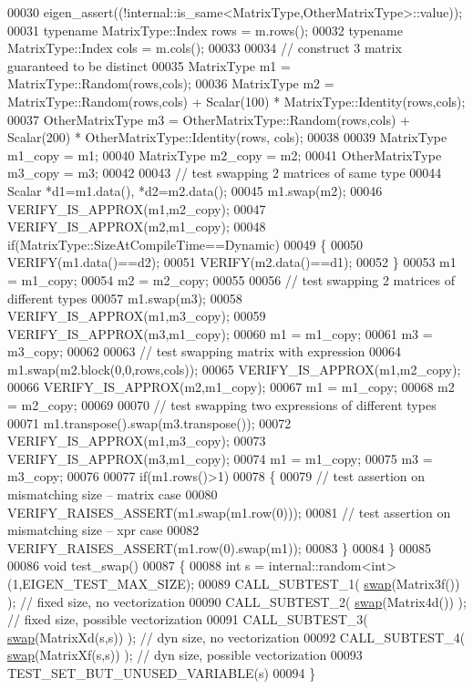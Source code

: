 \begin{DoxyCode}
00030   eigen\_assert((!internal::is\_same<MatrixType,OtherMatrixType>::value));
00031   \textcolor{keyword}{typename} MatrixType::Index rows = m.rows();
00032   \textcolor{keyword}{typename} MatrixType::Index cols = m.cols();
00033   
00034   \textcolor{comment}{// construct 3 matrix guaranteed to be distinct}
00035   MatrixType m1 = MatrixType::Random(rows,cols);
00036   MatrixType m2 = MatrixType::Random(rows,cols) + Scalar(100) * MatrixType::Identity(rows,cols);
00037   OtherMatrixType m3 = OtherMatrixType::Random(rows,cols) + Scalar(200) * OtherMatrixType::Identity(rows,
      cols);
00038   
00039   MatrixType m1\_copy = m1;
00040   MatrixType m2\_copy = m2;
00041   OtherMatrixType m3\_copy = m3;
00042   
00043   \textcolor{comment}{// test swapping 2 matrices of same type}
00044   Scalar *d1=m1.data(), *d2=m2.data();
00045   m1.swap(m2);
00046   VERIFY\_IS\_APPROX(m1,m2\_copy);
00047   VERIFY\_IS\_APPROX(m2,m1\_copy);
00048   \textcolor{keywordflow}{if}(MatrixType::SizeAtCompileTime==Dynamic)
00049   \{
00050     VERIFY(m1.data()==d2);
00051     VERIFY(m2.data()==d1);
00052   \}
00053   m1 = m1\_copy;
00054   m2 = m2\_copy;
00055   
00056   \textcolor{comment}{// test swapping 2 matrices of different types}
00057   m1.swap(m3);
00058   VERIFY\_IS\_APPROX(m1,m3\_copy);
00059   VERIFY\_IS\_APPROX(m3,m1\_copy);
00060   m1 = m1\_copy;
00061   m3 = m3\_copy;
00062   
00063   \textcolor{comment}{// test swapping matrix with expression}
00064   m1.swap(m2.block(0,0,rows,cols));
00065   VERIFY\_IS\_APPROX(m1,m2\_copy);
00066   VERIFY\_IS\_APPROX(m2,m1\_copy);
00067   m1 = m1\_copy;
00068   m2 = m2\_copy;
00069 
00070   \textcolor{comment}{// test swapping two expressions of different types}
00071   m1.transpose().swap(m3.transpose());
00072   VERIFY\_IS\_APPROX(m1,m3\_copy);
00073   VERIFY\_IS\_APPROX(m3,m1\_copy);
00074   m1 = m1\_copy;
00075   m3 = m3\_copy;
00076   
00077   \textcolor{keywordflow}{if}(m1.rows()>1)
00078   \{
00079     \textcolor{comment}{// test assertion on mismatching size -- matrix case}
00080     VERIFY\_RAISES\_ASSERT(m1.swap(m1.row(0)));
00081     \textcolor{comment}{// test assertion on mismatching size -- xpr case}
00082     VERIFY\_RAISES\_ASSERT(m1.row(0).swap(m1));
00083   \}
00084 \}
00085 
00086 \textcolor{keywordtype}{void} test\_swap()
00087 \{
00088   \textcolor{keywordtype}{int} s = internal::random<int>(1,EIGEN\_TEST\_MAX\_SIZE);
00089   CALL\_SUBTEST\_1( \hyperlink{endian_8c_a3ca5ecd34b04d6a243c054ac3a57f68d}{swap}(Matrix3f()) ); \textcolor{comment}{// fixed size, no vectorization }
00090   CALL\_SUBTEST\_2( \hyperlink{endian_8c_a3ca5ecd34b04d6a243c054ac3a57f68d}{swap}(Matrix4d()) ); \textcolor{comment}{// fixed size, possible vectorization }
00091   CALL\_SUBTEST\_3( \hyperlink{endian_8c_a3ca5ecd34b04d6a243c054ac3a57f68d}{swap}(MatrixXd(s,s)) ); \textcolor{comment}{// dyn size, no vectorization }
00092   CALL\_SUBTEST\_4( \hyperlink{endian_8c_a3ca5ecd34b04d6a243c054ac3a57f68d}{swap}(MatrixXf(s,s)) ); \textcolor{comment}{// dyn size, possible vectorization }
00093   TEST\_SET\_BUT\_UNUSED\_VARIABLE(s)
00094 \}
\end{DoxyCode}
